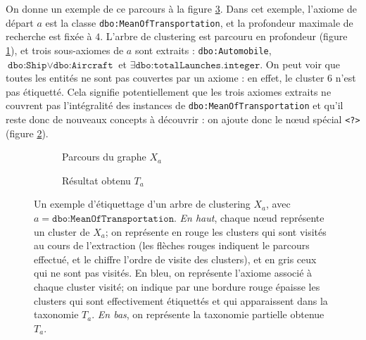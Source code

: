 On donne un exemple de ce parcours à la figure \ref{fig:texp-stebbstep}. Dans cet exemple, l'axiome de départ $a$ est la classe \texttt{dbo:MeanOfTransportation}, et la profondeur maximale de recherche est fixée à $4$. L'arbre de clustering est parcouru en profondeur (figure \ref{subfig:texp-sbs1}), et trois sous-axiomes de $a$ sont extraits : \texttt{dbo:Automobile}, $\texttt{dbo:Ship} \lor \texttt{dbo:Aircraft}$ et $\exists \texttt{dbo:totalLaunches} . \texttt{integer}$. On peut voir que toutes les entités ne sont pas couvertes par un axiome : en effet, le cluster 6 n'est pas étiquetté. Cela signifie potentiellement que les trois axiomes extraits ne couvrent pas l'intégralité des instances de \texttt{dbo:MeanOfTransportation} et qu'il reste donc de nouveaux concepts à découvrir : on ajoute donc le nœud spécial \texttt{<?>} (figure \ref{subfig:texp-sbs2}).

\begin{figure}
    \centering
    \begin{subfigure}{\textwidth}
        \centering
        
        \caption{Parcours du graphe $X_a$}
        \label{subfig:texp-sbs1}
    \end{subfigure}
    \begin{subfigure}{\textwidth}
        \centering
        
        \caption{Résultat obtenu $T_a$}
        \label{subfig:texp-sbs2}
    \end{subfigure}
    \caption[Parcours et étiquettage d'un arbre de clustering]{Un exemple d'étiquettage d'un arbre de clustering $X_a$, avec $a = \texttt{dbo:MeanOfTransportation}$. \textit{En haut}, chaque nœud représente un cluster de $X_a$; on représente en rouge les clusters qui sont visités au cours de l'extraction (les flèches rouges indiquent le parcours effectué, et le chiffre l'ordre de visite des clusters), et en gris ceux qui ne sont pas visités. En bleu, on représente l'axiome associé à chaque cluster visité; on indique par une bordure rouge épaisse les clusters qui sont effectivement étiquettés et qui apparaissent dans la taxonomie $T_a$. \textit{En bas}, on représente la taxonomie partielle obtenue $T_a$.}
    \label{fig:texp-stebbstep}
\end{figure}

%    


